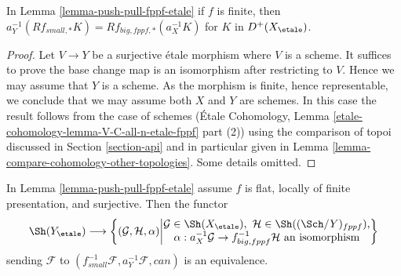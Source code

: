\begin{lemma}
\label{lemma-finite-push-pull-fppf-etale}
In Lemma \ref{lemma-push-pull-fppf-etale} if $f$ is finite, then
$a_Y^{-1}(Rf_{small, *}K) = Rf_{big, fppf, *}(a_X^{-1}K)$
for $K$ in $D^+(X_\etale)$.
\end{lemma}

\begin{proof}
Let $V \to Y$ be a surjective \'etale morphism where $V$ is a scheme.
It suffices to prove the base change map is an isomorphism after
restricting to $V$. Hence we may assume that $Y$ is a scheme.
As the morphism is finite, hence representable, we conclude
that we may assume both $X$ and $Y$ are schemes. In this case
the result follows from the case of schemes
(\'Etale Cohomology, Lemma \ref{etale-cohomology-lemma-V-C-all-n-etale-fppf}
part (2)) using the comparison of topoi discussed in
Section \ref{section-api}
and in particular given in
Lemma \ref{lemma-compare-cohomology-other-topologies}.
Some details omitted.
\end{proof}

\begin{lemma}
\label{lemma-descent-sheaf-fppf-etale}
In Lemma \ref{lemma-push-pull-fppf-etale} assume
$f$ is flat, locally of finite presentation, and surjective.
Then the functor
$$
\Sh(Y_\etale) \longrightarrow
\left\{
(\mathcal{G}, \mathcal{H}, \alpha)
\middle|
\begin{matrix}
\mathcal{G} \in \Sh(X_\etale),\ \mathcal{H} \in \Sh((\Sch/Y)_{fppf}), \\
\alpha : a_X^{-1}\mathcal{G} \to f_{big, fppf}^{-1}\mathcal{H}
\text{ an isomorphism}
\end{matrix}
\right\}
$$
sending $\mathcal{F}$ to
$(f_{small}^{-1}\mathcal{F}, a_Y^{-1}\mathcal{F}, can)$ is an equivalence.
\end{lemma}


